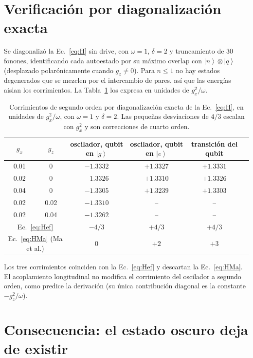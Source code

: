 \documentclass[11pt]{report}
\newcommand{\ket}[1]{\left|#1\right\rangle}
\begin{document}
\section{Verificaci\'on por diagonalizaci\'on exacta}

Se diagonaliz\'o la Ec.~\eqref{eq:H} sin drive, con $\omega=1$, $\delta=2$ y truncamiento de 30 fonones, identificando cada autoestado por su m\'aximo overlap con $\ket{n}\otimes\ket{q}$ (desplazado polar\'onicamente cuando $g_{z}\neq0$). Para $n\leq1$ no hay estados degenerados que se mezclen por el intercambio de pares, as\'i que las energ\'ias aislan los corrimientos. La Tabla~\ref{tab:ED} los expresa en unidades de $g_{x}^{2}/\omega$.

\begin{table}[h]
\centering
\begin{tabular}{cccccc}
\toprule
$g_{x}$ & $g_{z}$ & oscilador, qubit en $\ket{g}$ & oscilador, qubit en $\ket{e}$ & transici\'on del qubit\\
\midrule
0.01 & 0 & $-1.3332$ & $+1.3327$ & $+1.3331$\\
0.02 & 0 & $-1.3326$ & $+1.3310$ & $+1.3326$\\
0.04 & 0 & $-1.3305$ & $+1.3239$ & $+1.3303$\\
0.02 & 0.02 & $-1.3310$ & -- & --\\
0.02 & 0.04 & $-1.3262$ & -- & --\\
\midrule
\multicolumn{2}{c}{Ec.~\eqref{eq:Hef}} & $-4/3$ & $+4/3$ & $+4/3$\\
\multicolumn{2}{c}{Ec.~\eqref{eq:HMa} (Ma et al.)} & $0$ & $+2$ & $+3$\\
\bottomrule
\end{tabular}
\caption{Corrimientos de segundo orden por diagonalizaci\'on exacta de la Ec.~\eqref{eq:H}, en unidades de $g_{x}^{2}/\omega$, con $\omega=1$ y $\delta=2$. Las peque\~nas desviaciones de $4/3$ escalan con $g_{x}^{2}$ y son correcciones de cuarto orden.}
\label{tab:ED}
\end{table}

Los tres corrimientos coinciden con la Ec.~\eqref{eq:Hef} y descartan la Ec.~\eqref{eq:HMa}. El acoplamiento longitudinal no modifica el corrimiento del oscilador a segundo orden, como predice la derivaci\'on (su \'unica contribuci\'on diagonal es la constante $-g_{z}^{2}/\omega$).

\section{Consecuencia: el estado oscuro deja de existir}
\end{document}

